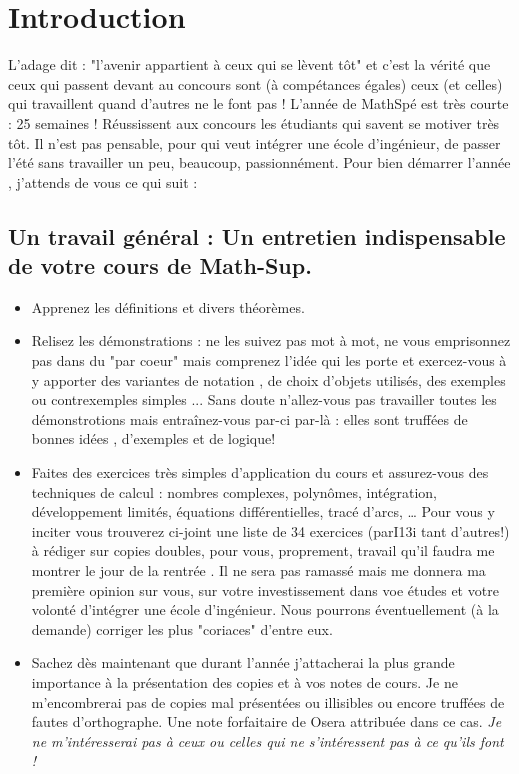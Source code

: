 \chapter*{Introduction}

L'adage dit : "l'avenir appartient à ceux qui se lèvent tôt" et c'est la vérité que ceux qui passent devant au
concours sont (à compétances égales) ceux (et celles) qui travaillent quand d'autres ne le font pas !
L'année de MathSpé est très courte : 25 semaines ! Réussissent aux concours les étudiants qui savent se motiver
très tôt. Il n'est pas pensable, pour qui veut intégrer une école d'ingénieur, de passer l'été sans travailler un
peu, beaucoup, passionnément. Pour bien démarrer l'année , j'attends de vous ce qui suit :

\section*{Un travail général : Un entretien indispensable de votre cours de Math-Sup.}
\begin{itemize}
\item Apprenez les définitions et divers théorèmes.
\item Relisez les démonstrations : ne les suivez pas mot à mot, ne vous emprisonnez pas dans du "par coeur"
mais comprenez l'idée qui les porte et exercez-vous à y apporter des variantes de notation , de choix d'objets
utilisés, des exemples ou contrexemples simples ...
Sans doute n'allez-vous pas travailler toutes les démonstrotions mais entraînez-vous par-ci par-là : elles sont
truffées de bonnes idées , d'exemples et de logique!
\item Faites des exercices très simples d'application du cours et assurez-vous des techniques de calcul :
nombres complexes, polynômes, intégration, développement limités, équations différentielles, tracé d'arcs, \ldots
Pour vous y inciter vous trouverez ci-joint une liste de 34 exercices (parI13i tant d'autres!) à rédiger sur
copies doubles, pour vous, proprement, travail qu'il faudra me montrer le jour de la rentrée . Il ne sera pas
ramassé mais me donnera ma première opinion sur vous, sur votre investissement dans voe études et votre
volonté d'intégrer une école d'ingénieur. Nous pourrons éventuellement (à la demande) corriger les plus
"coriaces" d'entre eux.
\item Sachez dès maintenant que durant l'année j'attacherai la plus grande importance à la présentation des
copies et à vos notes de cours. Je ne m'encombrerai pas de copies mal présentées ou illisibles ou encore truffées
de fautes d'orthographe. Une note forfaitaire de Osera attribuée dans ce cas.
\emph{Je ne m'intéresserai pas à ceux ou celles qui ne s'intéressent pas à ce qu'ils font !}
\end{itemize}
